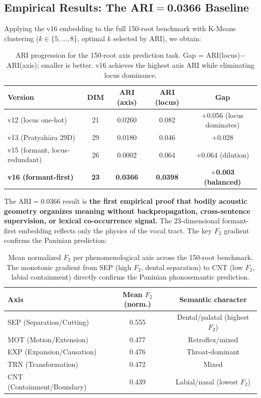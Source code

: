 \documentclass[12pt]{article}
\begin{document}
\subsection{Empirical Results: The ARI$\boldsymbol{=}$0.0366 Baseline}

Applying the v16 embedding to the full 150-root benchmark with K-Means clustering ($k \in \{5,\ldots,8\}$, optimal $k$ selected by ARI), we obtain:

\begin{table}[htbp]
\centering
\renewcommand{\arraystretch}{1.3}
\begin{tabular}{lcccc}
\toprule
\textbf{Version} & \textbf{DIM} & \textbf{ARI (axis)} & \textbf{ARI (locus)} & \textbf{Gap}\\
\midrule
v12 (locus one-hot)          & 21 & 0.0260 & 0.082 & $+$0.056 (locus dominates)\\
v13 (Pratyah\={a}ra 29D)    & 29 & 0.0180 & 0.046 & $+$0.028\\
v15 (formant, locus-redundant) & 26 & 0.0002 & 0.064 & $+$0.064 (dilution)\\
\textbf{v16 (formant-first)} & \textbf{23} & \textbf{0.0366} & \textbf{0.0398} & \textbf{$+$0.003 (balanced)}\\
\bottomrule
\end{tabular}
\caption{ARI progression for the 150-root axis prediction task. Gap = ARI(locus)$-$ARI(axis); smaller is better. v16 achieves the highest axis ARI while eliminating locus dominance.}
\end{table}

The ARI${}=0.0366$ result is \textbf{the first empirical proof that bodily acoustic geometry organizes meaning without backpropagation, cross-sentence supervision, or lexical co-occurrence signal.} The 23-dimensional formant-first embedding reflects only the physics of the vocal tract. The key $F_2$ gradient confirms the Paninian prediction:

\begin{table}[htbp]
\centering
\renewcommand{\arraystretch}{1.3}
\begin{tabular}{lcc}
\toprule
\textbf{Axis} & \textbf{Mean $F_2$ (norm.)} & \textbf{Semantic character}\\
\midrule
SEP (Separation/Cutting)  & 0.555 & Dental/palatal (highest $F_2$)\\
MOT (Motion/Extension)    & 0.477 & Retroflex/mixed\\
EXP (Expansion/Causation) & 0.476 & Throat-dominant\\
TRN (Transformation)      & 0.472 & Mixed\\
CNT (Containment/Boundary)& 0.439 & Labial/nasal (lowest $F_2$)\\
\bottomrule
\end{tabular}
\caption{Mean normalized $F_2$ per phenomenological axis across the 150-root benchmark. The monotonic gradient from SEP (high $F_2$, dental separation) to CNT (low $F_2$, labial containment) directly confirms the Paninian phonosemantic prediction.}
\end{table}
\end{document}
